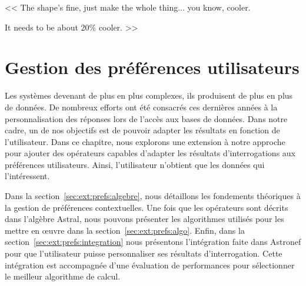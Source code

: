\begin{savequote}[6cm]
<< The shape's fine, just make the whole thing... you know, cooler. 

\quad It needs to be about 20\% cooler. >>
\end{savequote}
\chapter{Gestion des préférences utilisateurs}\label{chap:prefs}
\chaptertoc

Les systèmes devenant de plus en plus complexes, ils produisent de plus en plus de données. De nombreux efforts ont été consacrés ces dernières années à la personnalisation des réponses lors de l'accès aux bases de données. Dans notre cadre, un de nos objectifs est de pouvoir adapter les résultats en fonction de l'utilisateur. Dans ce chapitre, nous explorons une extension à notre approche pour ajouter des opérateurs capables d'adapter les résultats d'interrogations aux préférences utilisateurs. Ainsi, l'utilisateur n'obtient que les données qui l'intéressent.

Dans la section~\ref{sec:ext:prefs:algebre}, nous détaillons les fondements théoriques à la gestion de préférences contextuelles. Une fois que les opérateurs sont décrits dans l'algèbre Astral, nous pouvons présenter les algorithmes utilisés pour les mettre en œuvre dans la section~\ref{sec:ext:prefs:algo}. Enfin, dans la section~\ref{sec:ext:prefs:integration} nous présentons l'intégration faite dans Astronef pour que l'utilisateur puisse personnaliser ses résultats d'interrogation. Cette intégration est accompagnée d'une évaluation de performances pour sélectionner le meilleur algorithme de calcul.





